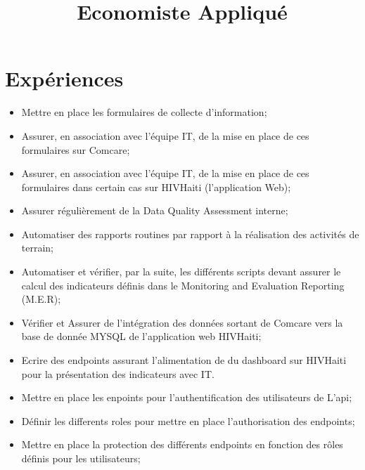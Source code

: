 \documentclass[11pt,a4paper]{moderncv}
\title{Economiste Appliqu\'{e}}
\begin{document}
\maketitle
\section{Expériences}
{
	\begin{itemize}%
		\item Mettre en place les formulaires de collecte d'information;
		\item Assurer, en association avec l'\'{e}quipe IT, de la mise en place de ces formulaires sur Comcare;
		\item Assurer, en association avec l'\'{e}quipe IT, de la mise en place de ces formulaires dans certain cas sur HIVHaiti (l'application Web);
		\item Assurer r\'{e}guli\`{e}rement de la Data Quality Assessment interne;
		\item Automatiser des rapports routines par rapport \`{a} la r\'{e}alisation des activit\'{e}s de terrain;
		\item Automatiser et v\'{e}rifier, par la suite, les diff\'{e}rents scripts devant assurer le calcul des indicateurs d\'{e}finis dans le Monitoring and Evaluation Reporting (M.E.R);
		\item V\'{e}rifier et Assurer de l'int\'{e}gration des donn\'{e}es sortant de Comcare vers la base de donn\'{e}e MYSQL de l'application web HIVHaiti;
		\item Ecrire des endpoints assurant l'alimentation de du dashboard sur HIVHaiti pour la pr\'{e}sentation des indicateurs avec IT.
	\end{itemize}
}

{
	\begin{itemize}%
		\item  Mettre en place les enpoints pour l'authentification des utilisateurs de L'api;
		\item  D\'{e}finir les differents roles pour mettre en place l'authorisation des endpoints;
		\item  Mettre en place la protection des diff\'{e}rents endpoints en fonction des r\^{o}les d\'{e}finis pour les utilisateurs;
	\end{itemize}
}
\end{document}
